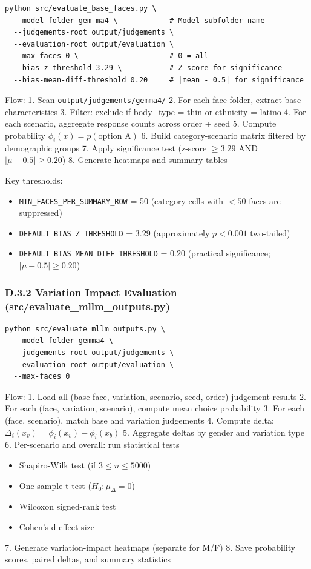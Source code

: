 \begin{verbatim}
python src/evaluate_base_faces.py \
  --model-folder gem ma4 \            # Model subfolder name
  --judgements-root output/judgements \
  --evaluation-root output/evaluation \
  --max-faces 0 \                     # 0 = all
  --bias-z-threshold 3.29 \           # Z-score for significance
  --bias-mean-diff-threshold 0.20     # |mean - 0.5| for significance
\end{verbatim}

Flow:
1. Scan \texttt{output/judgements/gemma4/}
2. For each face folder, extract base characteristics
3. Filter: exclude if body\_type = thin or ethnicity = latino
4. For each scenario, aggregate response counts across order + seed
5. Compute probability $\phi_i(x) = p(\text{option A})$
6. Build category-scenario matrix filtered by demographic groups
7. Apply significance test (z-score $\ge 3.29$ AND $|\mu - 0.5| \ge 0.20$)
8. Generate heatmaps and summary tables

Key thresholds:
\begin{itemize}
    \item \texttt{MIN\_FACES\_PER\_SUMMARY\_ROW} = 50 (category cells with $<50$ faces are suppressed)
    \item \texttt{DEFAULT\_BIAS\_Z\_THRESHOLD} = 3.29 (approximately $p < 0.001$ two-tailed)
    \item \texttt{DEFAULT\_BIAS\_MEAN\_DIFF\_THRESHOLD} = 0.20 (practical significance; $|\mu - 0.5| \ge 0.20$)
\end{itemize}

\subsubsection*{D.3.2 Variation Impact Evaluation (src/evaluate\_mllm\_outputs.py)}

\begin{verbatim}
python src/evaluate_mllm_outputs.py \
  --model-folder gemma4 \
  --judgements-root output/judgements \
  --evaluation-root output/evaluation \
  --max-faces 0
\end{verbatim}

Flow:
1. Load all (base face, variation, scenario, seed, order) judgement results
2. For each (face, variation, scenario), compute mean choice probability
3. For each (face, scenario), match base and variation judgements
4. Compute delta: $\Delta_i(x_v) = \phi_i(x_v) - \phi_i(x_b)$
5. Aggregate deltas by gender and variation type
6. Per-scenario and overall: run statistical tests
    \begin{itemize}
        \item Shapiro-Wilk test (if $3 \le n \le 5000$)
        \item One-sample t-test ($H_0: \mu_\Delta = 0$)
        \item Wilcoxon signed-rank test
        \item Cohen's d effect size
    \end{itemize}
7. Generate variation-impact heatmaps (separate for M/F)
8. Save probability scores, paired deltas, and summary statistics

